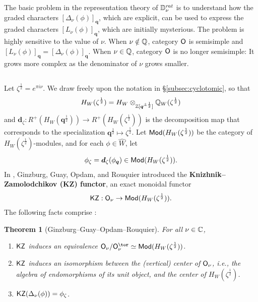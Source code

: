 \documentclass[a4paper,10pt,leqno]{amsart}
\theoremstyle{plain}
\theoremstyle{plain}
\newtheorem{thm}{Theorem}[subsection]
\theoremstyle{plain}
\theoremstyle{definition}
\theoremstyle{remark}
\newcommand{\dfemph}[1]{\textbf{#1}}
\newcommand{\Q}{\bm{q}}
\newcommand{\rat}{\mathit{rat}}
\newcommand{\slope}{\nu}
\begin{document}
The basic problem in the representation theory of $\bb{D}_\slope^\rat$ is to understand how the graded characters $[\Delta_\slope(\phi)]_{\Q}$, which are explicit, can be used to express the graded characters $[L_\slope(\phi)]_{\Q}$, which are initially mysterious.
The problem is highly sensitive to the value of $\slope$.
When $\slope \notin \bb{Q}$, category $\sf{O}$ is semisimple and $[L_\slope(\phi)]_{\Q} = [\Delta_\slope(\phi)]_{\Q}$.
When $\slope \in \bb{Q}$, category $\sf{O}$ is no longer semisimple:
It grows more complex as the denominator of $\slope$ grows smaller.

\subsection{}

Let $\zeta^{\frac{1}{2}} = e^{\pi i\slope}$.
We draw freely upon the notation in \S\ref{subsec:cyclotomic}, so that
\begin{align}
H_W(\zeta^{\frac{1}{2}}) = H_W \otimes_{\bb{Z}[\Q^{\pm\frac{1}{2}}]} \bb{Q}_W(\zeta^{\frac{1}{2}})
\end{align}
and $\bm{d}_\zeta : R^+(H_W(\Q^{\frac{1}{2}})) \to R^+(H_W(\zeta^{\frac{1}{2}}))$ is the decomposition map that corresponds to the specialization $\Q^{\frac{1}{2}} \mapsto \zeta^{\frac{1}{2}}$.
Let $\sf{Mod}(H_W(\zeta^{\frac{1}{2}}))$ be the category of $H_W(\zeta^{\frac{1}{2}})$-modules, and for each $\phi \in \hat{W}$, let
\begin{align}
\phi_\zeta = \bm{d}_\zeta(\phi_{\Q}) \in \sf{Mod}(H_W(\zeta^{\frac{1}{2}})).
\end{align}
In \cite{ggor}, Ginzburg, Guay, Opdam, and Rouquier introduced the \dfemph{Knizhnik--Zamolodchikov (KZ) functor}, an exact monoidal functor
\begin{align}
\sf{KZ} : \sf{O}_\slope \to \sf{Mod}(H_W(\zeta^{\frac{1}{2}})).
\end{align}
The following facts comprise \cite[Thm.\ 5.14, Cor.\ 5.18, Thm.\ 6.8]{ggor}:

\begin{thm}[Ginzburg--Guay--Opdam--Rouquier]\label{thm:ggor}
For all $\slope \in \bb{C}$,
\begin{enumerate}
\item 	$\sf{KZ}$ induces an equivalence $\sf{O}_\slope/\sf{O}_\slope^\tor \simeq \sf{Mod}(H_W(\zeta^{\frac{1}{2}}))$.
\item 	$\sf{KZ}$ induces an isomorphism between the (vertical) center of $\sf{O}_\slope$, \emph{i.e.}, the algebra of endomorphisms of its unit object, and the center of $H_W(\zeta^{\frac{1}{2}})$.
\item 	$\sf{KZ}(\Delta_\slope(\phi)) = \phi_\zeta$.
\end{enumerate}
\end{thm}
\end{document}
